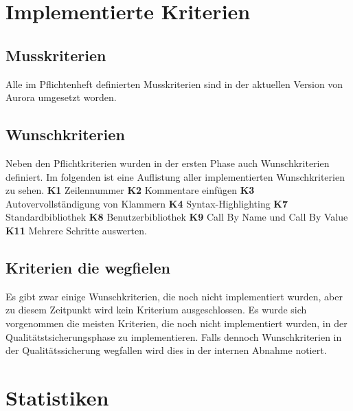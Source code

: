 \documentclass[parskip=full,11pt,twoside]{scrartcl}
\begin{document}
\newpage


\section{Implementierte Kriterien}

\subsection{Musskriterien}
Alle im Pflichtenheft definierten Musskriterien sind in der aktuellen Version von Aurora umgesetzt worden.

\subsection{Wunschkriterien}
Neben den Pflichtkriterien wurden in der ersten Phase auch Wunschkriterien definiert.
Im folgenden ist eine Auflistung aller implementierten Wunschkriterien zu sehen.
\newline
\newline
\textbf{K1} Zeilennummer
\newline
\textbf{K2} Kommentare einfügen
\newline
\textbf{K3} Autovervollständigung von Klammern
\newline
\textbf{K4} Syntax-Highlighting
\newline
\textbf{K7} Standardbibliothek
\newline
\textbf{K8} Benutzerbibliothek
\bigbreak
\textbf{K9} Call By Name und Call By Value
\smallbreak
\textbf{K11} Mehrere Schritte auswerten.
\newline

\subsection{Kriterien die wegfielen}
Es gibt zwar einige Wunschkriterien, die noch nicht implementiert wurden,
aber zu diesem Zeitpunkt wird kein Kriterium ausgeschlossen. Es wurde sich
vorgenommen die meisten Kriterien, die noch nicht implementiert wurden,
in der Qualitätstsicherungsphase zu implementieren.
Falls dennoch Wunschkriterien in der Qualitätssicherung wegfallen wird dies in der internen Abnahme notiert.
\newpage


\section{Statistiken}
\end{document}
